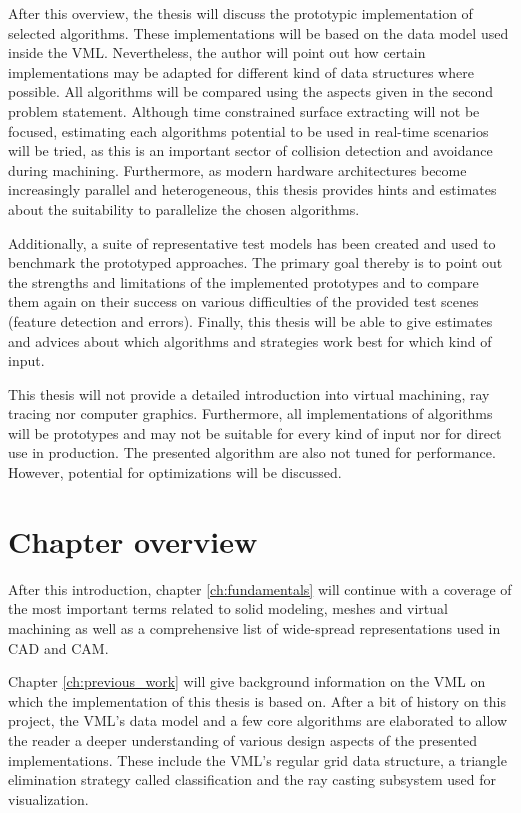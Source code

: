After this overview, the thesis will discuss the prototypic implementation of selected algorithms.
These implementations will be based on the data model used inside the VML.
Nevertheless, the author will point out how certain implementations may be adapted for different kind of data structures where possible.
All algorithms will be compared using the aspects given in the second problem statement.
Although time constrained surface extracting will not be focused, estimating each algorithms potential to be used in real-time scenarios will be tried, as this is an important sector of collision detection and avoidance during machining.
Furthermore, as modern hardware architectures become increasingly parallel and heterogeneous, this thesis provides hints and estimates about the suitability to parallelize the chosen algorithms.

Additionally, a suite of representative test models has been created and used to benchmark the prototyped approaches.
The primary goal thereby is to point out the strengths and limitations of the implemented prototypes and to compare them again on their success on various difficulties of the provided test scenes (\eg feature detection and errors).
Finally, this thesis will be able to give estimates and advices about which algorithms and strategies work best for which kind of input.

This thesis will not provide a detailed introduction into virtual machining, ray tracing nor computer graphics.
Furthermore, all implementations of algorithms will be prototypes and may not be suitable for every kind of input nor for direct use in production.
The presented algorithm are also not tuned for performance.
However, potential for optimizations will be discussed.


\section{Chapter overview}
\label{sec:chapter_overview}

After this introduction, chapter \ref{ch:fundamentals} will continue with a coverage of the most important terms related to solid modeling, meshes and virtual machining as well as a comprehensive list of wide-spread representations used in CAD and CAM.

Chapter \ref{ch:previous_work} will give background information on the VML on which the implementation of this thesis is based on.
After a bit of history on this project, the VML's data model and a few core algorithms are elaborated to allow the reader a deeper understanding of various design aspects of the presented implementations. These include the VML's regular grid data structure, a triangle elimination strategy called classification and the ray casting subsystem used for visualization.

